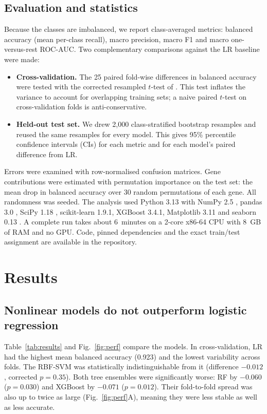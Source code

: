 \documentclass[10pt,twocolumn]{article}
\begin{document}
\subsection{Evaluation and statistics}
Because the classes are imbalanced, we report class-averaged metrics: balanced accuracy (mean per-class recall), macro precision, macro F1 and macro one-versus-rest ROC-AUC. Two complementary comparisons against the LR baseline were made:
\begin{itemize}
\item \textbf{Cross-validation.} The 25 paired fold-wise differences in balanced accuracy were tested with the corrected resampled $t$-test of \citet{nadeau2003}. This test inflates the variance to account for overlapping training sets; a naive paired $t$-test on cross-validation folds is anti-conservative.
\item \textbf{Held-out test set.} We drew 2,000 class-stratified bootstrap resamples \citep{efron1993} and reused the same resamples for every model. This gives 95\% percentile confidence intervals (CIs) for each metric and for each model's paired difference from LR.
\end{itemize}
Errors were examined with row-normalised confusion matrices. Gene contributions were estimated with permutation importance \citep{breiman2001} on the test set: the mean drop in balanced accuracy over 30 random permutations of each gene. All randomness was seeded. The analysis used Python 3.13 with NumPy 2.5 \citep{harris2020}, pandas 3.0 \citep{mckinney2010}, SciPy 1.18 \citep{virtanen2020}, scikit-learn 1.9.1, XGBoost 3.4.1, Matplotlib 3.11 \citep{hunter2007} and seaborn 0.13 \citep{waskom2021}. A complete run takes about 6~minutes on a 2-core x86-64 CPU with 8~GB of RAM and no GPU. Code, pinned dependencies and the exact train/test assignment are available in the repository.

\section{Results}\label{sec:results}
\subsection{Nonlinear models do not outperform logistic regression}
Table~\ref{tab:results} and Fig.~\ref{fig:perf} compare the models. In cross-validation, LR had the highest mean balanced accuracy (0.923) and the lowest variability across folds. The RBF-SVM was statistically indistinguishable from it (difference $-0.012$, corrected $p=0.35$). Both tree ensembles were significantly worse: RF by $-0.060$ ($p=0.030$) and XGBoost by $-0.071$ ($p=0.012$). Their fold-to-fold spread was also up to twice as large (Fig.~\ref{fig:perf}A), meaning they were less stable as well as less accurate.
\end{document}
